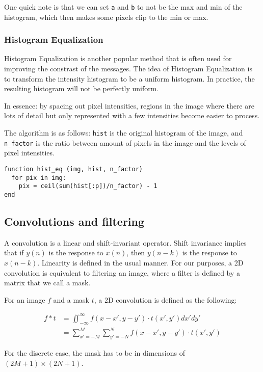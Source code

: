 \documentclass{article}
\begin{document}
\begin{multicols}{3}
One quick note is that we can set \texttt{a} and \texttt{b} to not be the max and min of the histogram, which then makes some pixels clip to the min or max.

\subsubsection{Histogram Equalization}

Histogram Equalization is another popular method that is often used for improving the constrast of the messages. The idea of Histogram Equalization is to transform the intensity histogram to be a uniform histogram. In practice, the resulting histogram will not be perfectly uniform. 

In essence: by spacing out pixel intensities, regions in the image where there are lots of detail but only represented with a few intensities become easier to process.

The algorithm is as follows: \texttt{hist} is the original histogram of the image, and \texttt{n\_factor} is the ratio between amount of pixels in the image and the levels of pixel intensities.

\begin{verbatim}
function hist_eq (img, hist, n_factor)
  for pix in img:
    pix = ceil(sum(hist[:p])/n_factor) - 1
end
\end{verbatim}

\subsection{Convolutions and filtering} 

A convolution is a linear and shift-invariant operator. Shift invariance implies that if $y(n)$ is the response to $x(n)$, then $y(n-k)$ is the response to $x(n-k)$. Linearity is defined in the usual manner. For our purposes, a 2D convolution is equivalent to filtering an image, where a filter is defined by a matrix that we call a mask.

For an image $f$ and a mask $t$, a 2D convolution is defined as the following:

\[
\begin{aligned}
f * t &= \iint_{-\infty}^{\infty} f(x-x', y-y') \cdot t(x',y') dx'dy'\\
      &= \sum_{x' = -M}^{M}\sum_{y' = -N}^{N} f(x-x', y-y') \cdot t(x', y')
\end{aligned}    
\]

For the discrete case, the mask has to be in dimensions of $(2M+1) \times (2N + 1)$.


\end{multicols}
\end{document}

